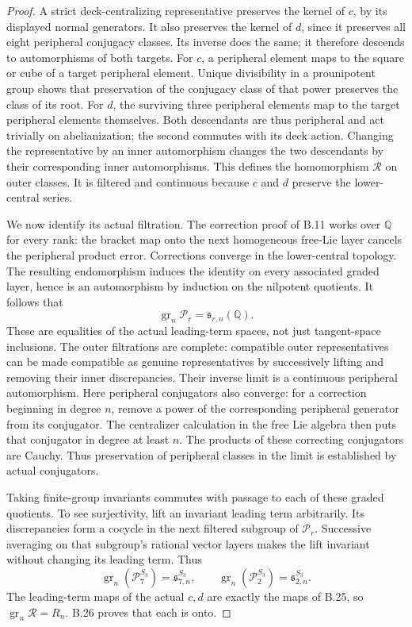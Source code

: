 \begin{proof}
A strict deck-centralizing representative preserves the
kernel of $c$, by its displayed normal generators. It also
preserves the kernel of $d$, since it preserves all eight
peripheral conjugacy classes. Its inverse does the same;
it therefore descends to automorphisms of both targets.
For $c$, a peripheral element maps to the square or cube
of a target peripheral element. Unique divisibility in a
prounipotent group shows that preservation of the conjugacy
class of that power preserves the class of its root.
For $d$, the surviving three peripheral elements map to
the target peripheral elements themselves. Both descendants
are thus peripheral and act trivially on abelianization;
the second commutes with its deck action. Changing the
representative by an inner automorphism changes the two
descendants by their corresponding inner automorphisms.
This defines the homomorphism $\mathcal R$ on outer classes.
It is filtered and continuous because $c$ and $d$ preserve
the lower-central series.

We now identify its actual filtration. The correction proof
of B.11 works over $\mathbb Q$ for every rank: the bracket
map onto the next homogeneous free-Lie layer cancels the
peripheral product error. Corrections converge in the
lower-central topology. The resulting endomorphism induces
the identity on every associated graded layer, hence is an
automorphism by induction on the nilpotent quotients. It
follows that
\[
           \operatorname{gr}_n\mathcal P_r
                         =\mathfrak s_{r,n}(\mathbb Q).
\]
These are equalities of the actual leading-term spaces,
not just tangent-space inclusions. The outer filtrations
are complete: compatible outer representatives can be made
compatible as genuine representatives by successively
lifting and removing their inner discrepancies. Their
inverse limit is a continuous peripheral automorphism.
Here peripheral conjugators also converge: for a correction
beginning in degree $n$, remove a power of the corresponding
peripheral generator from its conjugator. The centralizer
calculation in the free Lie algebra then puts that conjugator
in degree at least $n$. The products of these correcting
conjugators are Cauchy. Thus preservation of peripheral
classes in the limit is established by actual conjugators.

Taking finite-group invariants commutes with passage to
each of these graded quotients. To see surjectivity, lift
an invariant leading term arbitrarily. Its discrepancies
form a cocycle in the next filtered subgroup of
$\mathcal P_r$. Successive averaging on that subgroup's
rational vector layers makes the lift invariant without
changing its leading term. Thus
\[
 \operatorname{gr}_n(\mathcal P_7^{S_3})
       =\mathfrak s_{7,n}^{S_3},\qquad
 \operatorname{gr}_n(\mathcal P_2^{S_3})
       =\mathfrak s_{2,n}^{S_3}.
\]
The leading-term maps of the actual $c,d$ are exactly the
maps of B.25, so $\operatorname{gr}_n\mathcal R=R_n$.
B.26 proves that each is onto.


\end{proof}
